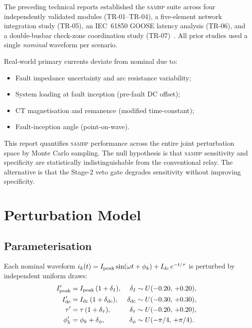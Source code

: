 \documentclass[12pt,a4paper]{article}
\newcommand{\SAMBP}{\textsc{sambp}}
\newcommand{\Ipeak}{I_{\rm peak}}
\begin{document}
The preceding technical reports established the \SAMBP{} suite across
four independently validated modules (TR-01–TR-04), a five-element
network integration study (TR-05), an IEC~61850 GOOSE latency analysis
(TR-06), and a double-busbar check-zone coordination study
(TR-07)~\citep{SAMBP_TR05,SAMBP_TR06,SAMBP_TR07}.  All prior studies
used a single \emph{nominal} waveform per scenario.

Real-world primary currents deviate from nominal due to:
\begin{itemize}[noitemsep]
  \item Fault impedance uncertainty and arc resistance variability;
  \item System loading at fault inception (pre-fault DC offset);
  \item CT magnetisation and remanence (modified time-constant);
  \item Fault-inception angle (point-on-wave).
\end{itemize}

This report quantifies \SAMBP{} performance across the entire joint
perturbation space by Monte Carlo sampling.  The null hypothesis is that
\SAMBP{} sensitivity and specificity are statistically indistinguishable
from the conventional relay.  The alternative is that the Stage-2 veto
gate degrades sensitivity without improving specificity.


\section{Perturbation Model}

\subsection{Parameterisation}

Each nominal waveform $i_k(t) = \Ipeak \sin(\omega t + \phi_k) +
I_{\rm dc}\,e^{-t/\tau}$ is perturbed by independent uniform draws:
\begin{align}
  \Ipeak' &= \Ipeak\,(1 + \delta_I), &
    \delta_I &\sim U(-0.20,\,+0.20), \label{eq:dI}\\
  I_{\rm dc}' &= I_{\rm dc}\,(1 + \delta_{\rm dc}), &
    \delta_{\rm dc} &\sim U(-0.30,\,+0.30), \label{eq:dDC}\\
  \tau' &= \tau\,(1 + \delta_\tau), &
    \delta_\tau &\sim U(-0.20,\,+0.20), \label{eq:dtau}\\
  \phi_k' &= \phi_k + \delta_\phi, &
    \delta_\phi &\sim U(-\pi/4,\,+\pi/4). \label{eq:dphi}
\end{align}
\end{document}
